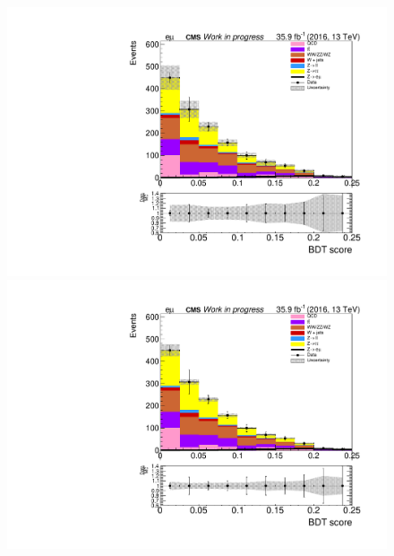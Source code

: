 \begin{figure}[htp]
	\centering
	\begin{multicols}{2}
		\includegraphics[width=\linewidth]{plots/em/OneJet_prefit.pdf}\par 
		\includegraphics[width=\linewidth]{plots/em/OneJet_postfit.pdf}\par
	\end{multicols}


\end{figure}
